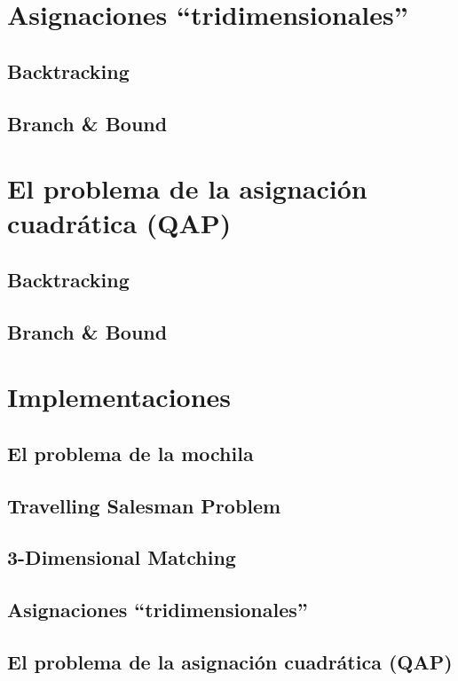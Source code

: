 \documentclass[a4paper, 11pt]{article} %
\begin{document}
\section{Asignaciones “tridimensionales”}
\subsection{Backtracking}
\subsection{Branch \& Bound}

\section{El problema de la asignación cuadrática (QAP)}
\subsection{Backtracking}
\subsection{Branch \& Bound}


\section{Implementaciones}
\subsection{El problema de la mochila}
\subsection{Travelling Salesman Problem}
\subsection{3-Dimensional Matching}
\subsection{Asignaciones “tridimensionales”}
\subsection{El problema de la asignación cuadrática (QAP)}

    
\end{document}

